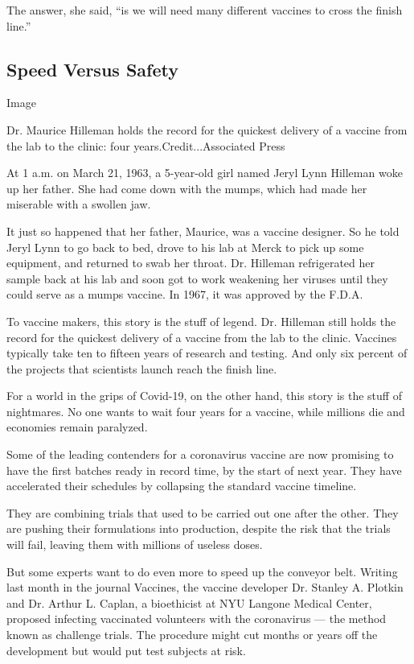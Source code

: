 The answer, she said, ``is we will need many different vaccines to cross
the finish line.''

\hypertarget{speed-versus-safety}{%
\subsection{Speed Versus Safety}\label{speed-versus-safety}}

Image

Dr. Maurice Hilleman holds the record for the quickest delivery of a
vaccine from the lab to the clinic: four years.Credit...Associated Press

At 1 a.m. on March 21, 1963, a 5-year-old girl named Jeryl Lynn Hilleman
woke up her father. She had come down with the mumps, which had made her
miserable with a swollen jaw.

It just so happened that her father, Maurice, was a vaccine designer. So
he told Jeryl Lynn to go back to bed, drove to his lab at Merck to pick
up some equipment, and returned to swab her throat. Dr. Hilleman
refrigerated her sample back at his lab and soon got to work weakening
her viruses until they could serve as a mumps vaccine. In 1967, it was
approved by the F.D.A.

To vaccine makers, this story is the stuff of legend. Dr. Hilleman still
holds the record for the quickest delivery of a vaccine from the lab to
the clinic. Vaccines typically take ten to fifteen years of research and
testing. And only six percent of the projects that scientists launch
reach the finish line.

For a world in the grips of Covid-19, on the other hand, this story is
the stuff of nightmares. No one wants to wait four years for a vaccine,
while millions die and economies remain paralyzed.

Some of the leading contenders for a coronavirus vaccine are now
promising to have the first batches ready in record time, by the start
of next year. They have accelerated their schedules by collapsing the
standard vaccine timeline.

They are combining trials that used to be carried out one after the
other. They are pushing their formulations into production, despite the
risk that the trials will fail, leaving them with millions of useless
doses.

But some experts want to do even more to speed up the conveyor belt.
Writing last month in the journal Vaccines, the vaccine developer Dr.
Stanley A. Plotkin and Dr. Arthur L. Caplan, a bioethicist at NYU
Langone Medical Center, proposed infecting vaccinated volunteers with
the coronavirus --- the method known as challenge trials. The procedure
might cut months or years off the development but would put test
subjects at risk.

